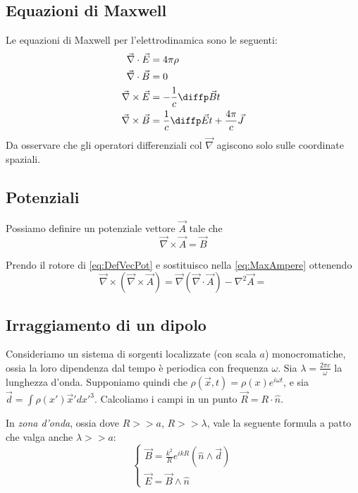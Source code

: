 \documentclass[a4paper,10pt,oneside]{math_article}
\newcommand{\rot}{\vec{\nabla} \times}
\renewcommand{\div}{\vec{\nabla} \cdot}
\newcommand{\grad}{\vec{\nabla}}
\newcommand{\lapl}{{\nabla}^2}
\begin{document}
		\subsection{Equazioni di Maxwell}
			Le equazioni di Maxwell per l'elettrodinamica sono le seguenti:
			\begin{align}\displaystyle
				\div \vec E &= 4\pi \rho \label{eq:MaxGauss}\\ 
				\div \vec B &= 0 \label{eq:MaxMonopole} \\
				\rot \vec E &= -\frac1c \diffp \vec{B}t \label{eq:MaxFaraday}\\
				\rot \vec B &= \dfrac1c \diffp \vec{E}t + \dfrac{4\pi}c \vec J \label{eq:MaxAmpere}
			\end{align}
			Da osservare che gli operatori differenziali col $\vec \nabla$ agiscono solo sulle coordinate spaziali.
		\subsection{Potenziali}
			Possiamo definire un potenziale vettore $\vec A$ tale che
			\begin{equation}\label{eq:DefVecPot}
			 \rot \vec A = \vec B
			\end{equation}

			Prendo il rotore di \ref{eq:DefVecPot} e sostituisco nella \ref{eq:MaxAmpere} ottenendo
			\begin{equation}
				\rot (\rot \vec A) = \grad(\div \vec A) - \lapl \vec A = 
			\end{equation}
			
		\subsection{Irraggiamento di un dipolo}
			Consideriamo un sistema di sorgenti localizzate (con scala $a$) monocromatiche, ossia la loro dipendenza dal tempo è periodica con frequenza $\omega$. Sia $\lambda=\frac{2\pi c}{\omega}$ la lunghezza d'onda.
			Supponiamo quindi che $\rho(\vec x, t) = \rho(x)e^{i\omega t}$, e sia $\vec d= \int \rho(x')\vec x' dx'^3$. Calcoliamo i campi in un punto $\vec R = R\cdot \hat n$.
			
			In \emph{zona d'onda}, ossia dove $R >> a$, $R >> \lambda$, vale la seguente formula a patto che valga anche $\lambda >> a$:
			\begin{equation}
				\begin{cases}
					\vec B = \frac{k^2}{R} e^{ikR} (\hat n \wedge \vec d)\\
					\vec E = \vec B \wedge \hat n
				\end{cases}
			\end{equation}
			
\end{document}

